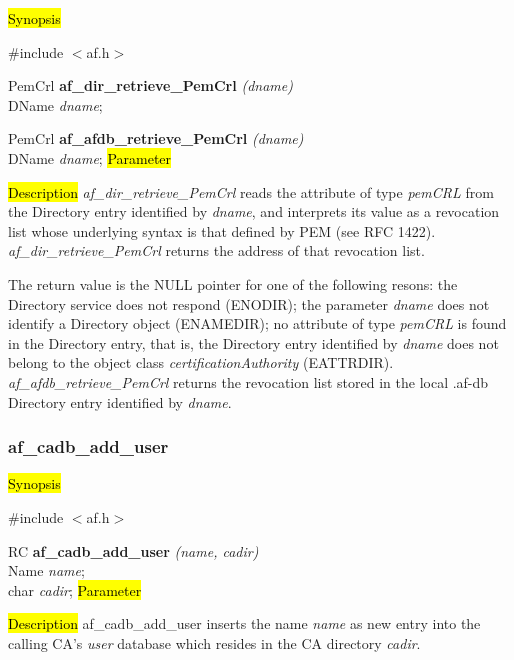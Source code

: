 \hl{Synopsis}

\#include $<$af.h$>$

PemCrl {\bf *af\_dir\_retrieve\_PemCrl} {\em (dname)} \\
DName {\em *dname};

PemCrl {\bf *af\_afdb\_retrieve\_PemCrl} {\em (dname)} \\
DName {\em *dname};
\hl{Parameter}

\hl{Description}
{\em af\_dir\_retrieve\_PemCrl} reads the attribute of type {\em pemCRL} from the Directory entry 
identified by {\em dname}, and interprets its value as a revocation list whose underlying
syntax is that defined by PEM (see RFC 1422).
{\em af\_dir\_retrieve\_PemCrl} returns the address of that revocation list.

The return value is the NULL pointer for one of the following resons:
\bi
\m the Directory service does not respond (ENODIR);
\m the parameter {\em dname} does not identify a Directory object (ENAMEDIR);
\m no attribute of type {\em pemCRL} is found in the Directory entry, that is, the 
Directory entry identified by {\em dname} does not belong to 
the object class {\em certificationAuthority} (EATTRDIR).
\ei
{\em af\_afdb\_retrieve\_PemCrl} returns the revocation list 
stored in the local .af-db Directory entry identified by {\em dname}.



\subsubsection{af\_cadb\_add\_user}
\label{af_cadb_add_user}

\hl{Synopsis}

\#include $<$af.h$>$

RC {\bf af\_cadb\_add\_user} {\em (name, cadir)} \\
Name {\em *name}; \\
char {\em *cadir};
\hl{Parameter}


\hl{Description}
af\_cadb\_add\_user inserts the name {\em name} as new entry into the calling CA's {\em user} 
database which resides in the CA directory {\em cadir}.

